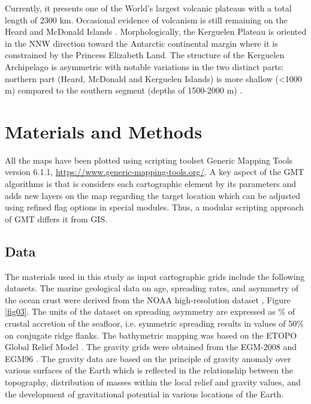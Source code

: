 \documentclass[geomatics,article,submit,pdftex,moreauthors]{Definitions/mdpi}
\begin{document}
Currently, it presents one of the World's largest volcanic plateaus with a total length of 2300 km. Occasional evidence of volcanism is still remaining on the Heard and McDonald Islands \cite{Li}. Morphologically, the Kerguelen Plateau is oriented in the NNW direction toward the Antarctic continental margin where it is constrained by the Princess Elizabeth Land. The structure of the Kerguelen Archipelago is asymmetric with notable variations in the two distinct parts: northern part (Heard, McDonald and Kerguelen Islands) is more shallow (<1000 m) compared to the southern segment (depths of 1500-2000 m) \cite{Ramsay}. 

\section{Materials and Methods}

All the maps have been plotted using scripting toolset Generic Mapping Tools version 6.1.1, \href{https://www.generic-mapping-tools.org/}{https://www.generic-mapping-tools.org/}. A key aspect of the GMT algorithms is that is considers each cartographic element by its parameters and adds new layers on the map regarding the target location which can be adjusted using refined flag options in special modules. Thus, a modular scripting approach of GMT differs it from GIS. 

\subsection{Data}

The materials used in this study as input cartographic grids include the following datasets. The marine geological data on age, spreading rates, and asymmetry of the ocean crust were derived from the NOAA high-resolution dataset \cite{Mueller}, Figure \ref{fig03}. The units of the dataset on spreading asymmetry are expressed as \% of crustal accretion of the seafloor, i.e. symmetric spreading results in values of 50\% on conjugate ridge flanks. The bathymetric mapping was based on the ETOPO Global Relief Model \cite{NOAA}. The gravity grids were obtained from the EGM-2008 and EGM96 \cite{Pavlis}. The gravity data are based on the principle of gravity anomaly over various surfaces of the Earth which is reflected in the relationship between the topography, distribution of masses within the local relief and gravity values, and the development of gravitational potential in various locations of the Earth. 
\end{document}
